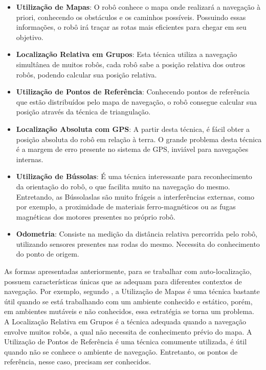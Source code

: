 	\begin{itemize}
		\item \textbf{Utilização de Mapas}: O robô conhece o mapa onde realizará a navegação à priori, conhecendo os obstáculos e os caminhos possíveis. Possuindo essas informações, o robô irá traçar as rotas mais eficientes para chegar em seu objetivo.

		\item \textbf{Localização Relativa em Grupos}: Esta técnica utiliza a navegação simultânea de muitos robôs, cada robô sabe a posição relativa dos outros robôs, podendo calcular sua posição relativa.

		\item \textbf{Utilização de Pontos de Referência}: Conhecendo pontos de referência que estão distribuídos pelo mapa de navegação, o robô consegue calcular sua posição através da técnica de triangulação.

		\item \textbf{Localização Absoluta com GPS}: A partir desta técnica, é fácil obter a posição absoluta do robô em relação à terra. O grande problema desta técnica é a margem de erro presente no sistema de GPS, inviável para navegações internas.

		\item \textbf{Utilização de Bússolas}: É uma técnica interessante para reconhecimento da orientação do robô, o que facilita muito na navegação do mesmo. Entretando, as Bússolaslas são muito frágeis a interferências externas, como por exemplo, a proximidade de materiais ferro-magnéticos ou as fugas magnéticas dos motores presentes no próprio robô.

		\item \textbf{Odometria}: Consiste na medição da distância relativa percorrida pelo robô, utilizando sensores presentes nas rodas do mesmo. Necessita do conhecimento do ponto de origem.
		 
	\end{itemize}

	As formas apresentadas anteriormente, para se trabalhar com auto-localização, possuem características únicas que as adequam para diferentes contextos de navegação. Por exemplo, segundo \cite{roboBulldozerIV}, a Utilização de Mapas é uma técnica bastante útil quando se está trabalhando com um ambiente conhecido e estático, porém, em ambientes mutáveis e não conhecidos, essa estratégia se torna um problema. A Localização Relativa em Grupos é a técnica adequada quando a navegação envolve muitos robôs, a qual não necessita de conhecimento prévio do mapa. A Utilização de Pontos de Referência é uma técnica comumente utilizada, é útil quando não se conhece o ambiente de navegação. Entretanto, os pontos de referência, nesse caso, precisam ser conhecidos. 

